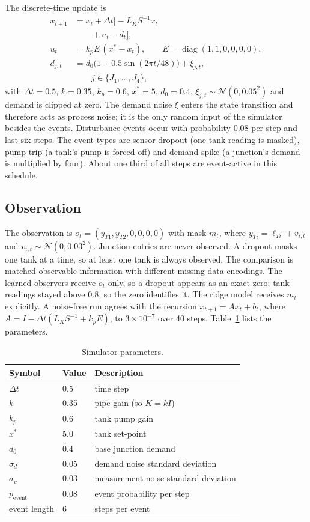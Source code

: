 \documentclass[conference]{IEEEtran}
\begin{document}
The discrete-time update is
\begin{align}
x_{t+1} &= x_t+\Delta t\big[-L_KS^{-1}x_t \\
&\qquad+u_t-d_t\big],\label{eq:dyn}\\
u_t &= k_pE\,(x^\ast-x_t),\qquad E=\operatorname{diag}(1,1,0,0,0,0),\label{eq:pump}\\
d_{j,t} &= d_0\big(1+0.5\sin(2\pi t/48)\big)+\xi_{j,t}, \\
&\qquad j\in\{J_1,\dots,J_4\},\label{eq:demand}
\end{align}
with $\Delta t=0.5$, $k=0.35$, $k_p=0.6$, $x^\ast=5$, $d_0=0.4$, $\xi_{j,t}\sim\mathcal N(0,0.05^2)$ and demand is clipped at zero. The demand noise $\xi$ enters the state transition and therefore acts as process noise; it is the only random input of the simulator besides the events. Disturbance events occur with probability $0.08$ per step and last six steps. The event types are sensor dropout (one tank reading is masked), pump trip (a tank's pump is forced off) and demand spike (a junction's demand is multiplied by four). About one third of all steps are event-active in this schedule.

\subsection{Observation}

The observation is $o_t=(y_{T1},y_{T2},0,0,0,0)$ with mask $m_t$, where $y_{Ti}=\ell_{Ti}+v_{i,t}$ and $v_{i,t}\sim\mathcal N(0,0.03^2)$. Junction entries are never observed. A dropout masks one tank at a time, so at least one tank is always observed. The comparison is matched observable information with different missing-data encodings. The learned observers receive $o_t$ only, so a dropout appears as an exact zero; tank readings stayed above $0.8$, so the zero identifies it. The ridge model receives $m_t$ explicitly. A noise-free run agrees with the recursion $x_{t+1}=Ax_t+b_t$, where $A=I-\Delta t(L_KS^{-1}+k_pE)$, to $3\times10^{-7}$ over 40 steps. Table~\ref{tab:params} lists the parameters.

\begin{table}[t]
\centering
\caption{Simulator parameters.}
\label{tab:params}
\small
\begin{tabular}{lll}
\toprule
Symbol & Value & Description \\
\midrule
$\Delta t$ & 0.5 & time step \\
$k$ & 0.35 & pipe gain (so $K=kI$) \\
$k_p$ & 0.6 & tank pump gain \\
$x^\ast$ & 5.0 & tank set-point \\
$d_0$ & 0.4 & base junction demand \\
$\sigma_d$ & 0.05 & demand noise standard deviation \\
$\sigma_v$ & 0.03 & measurement noise standard deviation \\
$p_{\text{event}}$ & 0.08 & event probability per step \\
event length & 6 & steps per event \\
\bottomrule
\end{tabular}
\end{table}
\end{document}
